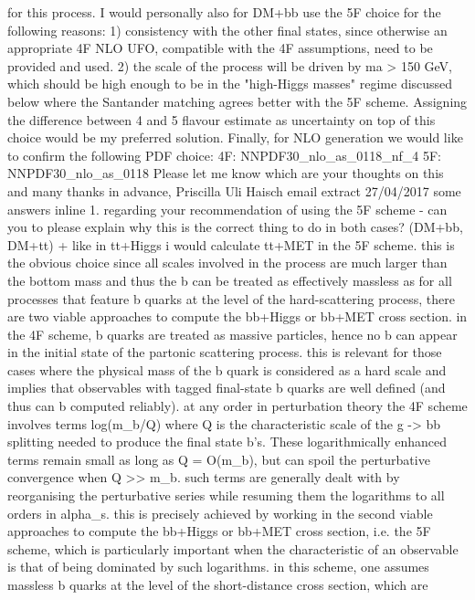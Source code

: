 {for this process. I would personally also for DM+bb use the 5F choice
for the following reasons: 1) consistency with the other final states,
since otherwise an appropriate 4F NLO UFO, compatible with the 4F
assumptions, need to be provided and used. 2) the scale of the process
will be driven by ma \textgreater{} 150 GeV, which should be high enough
to be in the "high-Higgs masses" regime discussed below where the
Santander matching agrees better with the 5F scheme. Assigning the
difference between 4 and 5 flavour estimate as uncertainty on top of
this choice would be my preferred solution. Finally, for NLO generation
we would like to confirm the following PDF choice: 4F:
NNPDF30\_nlo\_as\_0118\_nf\_4 5F: NNPDF30\_nlo\_as\_0118 Please let me
know which are your thoughts on this and many thanks in advance,
Priscilla Uli Haisch email extract 27/04/2017 some answers inline 1.
regarding your recommendation of using the 5F scheme - can you to please
explain why this is the correct thing to do in both cases? (DM+bb,
DM+tt) + like in tt+Higgs i would calculate tt+MET in the 5F scheme.
this is the obvious choice since all scales involved in the process are
much larger than the bottom mass and thus the b can be treated as
effectively massless as for all processes that feature b quarks at the
level of the hard-scattering process, there are two viable approaches to
compute the bb+Higgs or bb+MET cross section. in the 4F scheme, b quarks
are treated as massive particles, hence no b can appear in the initial
state of the partonic scattering process. this is relevant for those
cases where the physical mass of the b quark is considered as a hard
scale and implies that observables with tagged final-state b quarks are
well defined (and thus can b computed reliably). at any order in
perturbation theory the 4F scheme involves terms log(m\_b/Q) where Q is
the characteristic scale of the g -\textgreater{} bb splitting needed to
produce the final state b's. These logarithmically enhanced terms remain
small as long as Q = O(m\_b), but can spoil the perturbative convergence
when Q \textgreater{}\textgreater{} m\_b. such terms are generally dealt
with by reorganising the perturbative series while resuming them the
logarithms to all orders in alpha\_s. this is precisely achieved by
working in the second viable approaches to compute the bb+Higgs or
bb+MET cross section, i.e. the 5F scheme, which is particularly
important when the characteristic of an observable is that of being
dominated by such logarithms. in this scheme, one assumes massless b
quarks at the level of the short-distance cross section, which are
}
